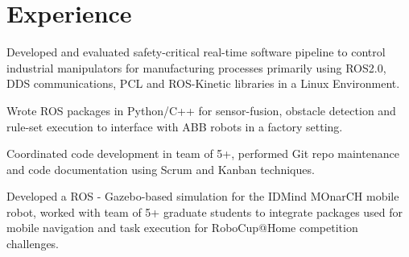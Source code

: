 \documentclass[letterpaper]{deedy-resume} %
\begin{document}
%
\begin{minipage}[t]{0.73\textwidth} %

\section{Experience}


\vspace{\topsep} %
\begin{tightitemize}
\item Developed and evaluated safety-critical real-time software pipeline to control industrial manipulators for manufacturing processes primarily using ROS2.0, DDS communications, PCL and ROS-Kinetic libraries in a Linux Environment.
\item Wrote ROS packages in Python/C++ for sensor-fusion, obstacle detection and rule-set execution to interface with ABB robots in a factory setting.
\item Coordinated code development in team of 5+, performed Git repo maintenance and code documentation using Scrum and Kanban techniques.
\end{tightitemize}

\sectionspace %


\newline
{}

\begin{tightitemize}
\item Developed a ROS - Gazebo-based simulation for the IDMind MOnarCH mobile robot, worked with team of 5+ graduate students to integrate packages used for mobile navigation and task execution for RoboCup@Home competition challenges.
\end{tightitemize}


\end{minipage}
\end{document}
